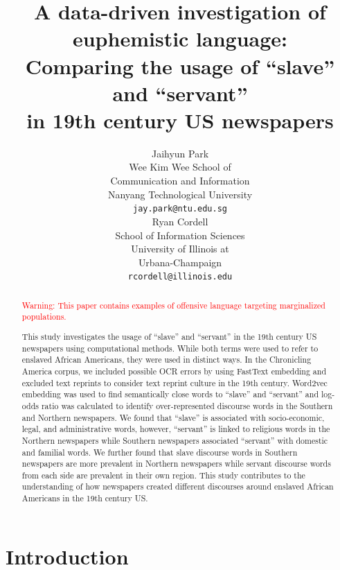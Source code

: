 \documentclass[11pt]{article}
\title{A data-driven investigation of euphemistic language: \\
Comparing the usage of “slave” and “servant” \\ 
in 19th century US newspapers}
\author{Jaihyun Park \\
  Wee Kim Wee School of \\
  Communication and Information \\
  Nanyang Technological University \\
  \texttt{jay.park@ntu.edu.sg} \\\And
  Ryan Cordell \\
  School of Information Sciences \\
  University of Illinois at \\
  Urbana-Champaign \\
  \texttt{rcordell@illinois.edu} \\}
\begin{document}
\maketitle
\begin{abstract}
\textcolor{red}{Warning: This paper contains examples of offensive language targeting marginalized populations.} 

This study investigates the usage of ``slave'' and ``servant'' in the 19th century US newspapers using computational methods. While both terms were used to refer to enslaved African Americans, they were used in distinct ways. In the Chronicling America corpus, we included possible OCR errors by using FastText embedding and excluded text reprints to consider text reprint culture in the 19th century. Word2vec embedding was used to find semantically close words to ``slave'' and ``servant'' and log-odds ratio was calculated to identify over-represented discourse words in the Southern and Northern newspapers. We found that ``slave'' is associated with socio-economic, legal, and administrative words, however, ``servant'' is linked to religious words in the Northern newspapers while Southern newspapers associated ``servant'' with domestic and familial words. We further found that slave discourse words in Southern newspapers are more prevalent in Northern newspapers while servant discourse words from each side are prevalent in their own region. This study contributes to the understanding of how newspapers created different discourses around enslaved African Americans in the 19th century US.

\end{abstract}

\section{Introduction}
\end{document}
